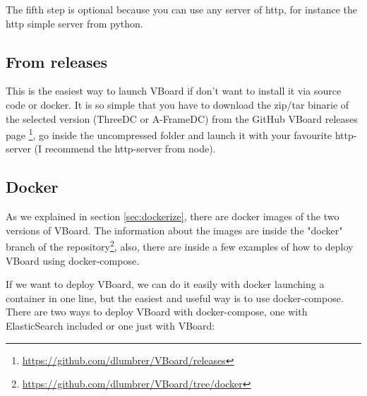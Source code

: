 \documentclass[a4paper, 12pt]{book}
\begin{document}
The fifth step is optional because you can use any server of http, for instance the http simple server from python.

\subsection{From releases}
This is the easiest way to launch VBoard if don't want to install it via source code or docker. It is so simple that you have to download the zip/tar binarie of the selected version (ThreeDC or A-FrameDC) from the GitHub VBoard releases page \footnote{\url{https://github.com/dlumbrer/VBoard/releases}}, go inside the uncompressed folder and launch it with your favourite http-server (I recommend the http-server from node).

\subsection{Docker}
As we explained in section \ref{sec:dockerize}, there are docker images of the two versions of VBoard. The information about the images are inside the "docker" branch of the repository\footnote{\url{https://github.com/dlumbrer/VBoard/tree/docker}}, also, there are inside a few examples of how to deploy VBoard using docker-compose.

If we want to deploy VBoard, we can do it easily with docker launching a container in one line, but the easiest and useful way is to use docker-compose. There are two ways to deploy VBoard with docker-compose, one with ElasticSearch included or one just with VBoard:
\end{document}
